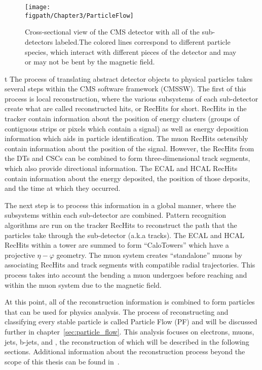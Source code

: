 \begin{figure}[!hbt]
    \centering
    \texttt{[image: \\figpath/Chapter3/ParticleFlow]}
    \caption{Cross-sectional view of the CMS detector with all of the sub-detectors labeled.The colored lines correspond to different particle species, which interact with different pieces of the detector and may or may not be bent by the magnetic field.}
    \label{fig:particle_flow}
\end{figure}
t
The process of translating abstract detector objects to physical particles takes several steps within the CMS software framework (CMSSW).
The first of this process is local reconstruction, where the various subsystems of each sub-detector create what are called reconstructed hits, or RecHits for short.
RecHits in the tracker contain information about the position of energy clusters (groups of contiguous strips or pixels which contain a signal) as well as energy deposition information which aids in particle identification.
The muon RecHits ostensibly contain information about the position of the signal.
However, the RecHits from the DTs and CSCs can be combined to form three-dimensional track segments, which also provide directional information.
The ECAL and HCAL RecHits contain information about the energy deposited, the position of those deposits, and the time at which they occurred.

The next step is to process this information in a global manner, where the subsystems within each sub-detector are combined.
Pattern recognition algorithms are run on the tracker RecHits to reconstruct the path that the particles take through the sub-detector (a.k.a tracks).
The ECAL and HCAL RecHits within a tower are summed to form ``CaloTowers'' which have a projective $\eta-\varphi$ geometry.
The muon system creates ``standalone'' muons by associating RecHits and track segments with compatible radial trajectories.
This process takes into account the bending a muon undergoes before reaching and within the muon system due to the magnetic field.

At this point, all of the reconstruction information is combined to form particles that can be used for physics analysis.
The process of reconstructing and classifying every stable particle is called Particle Flow (PF) and will be discussed further in chapter~\ref{sec:particle_flow}.
This analysis focuses on electrons, muons, jets, b-jets, and \ETslash, the reconstruction of which will be described in the following sections.
Additional information about the reconstruction process beyond the scope of this thesis can be found in~\cite{TDR-software}.

